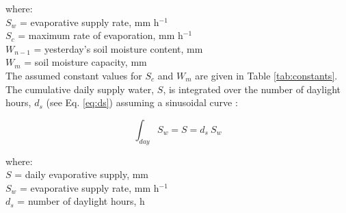 \noindent where: \\
\indent $S_w$ = evaporative supply rate, mm h$^{-1}$\\
\indent $S_c$ = maximum rate of evaporation, mm h$^{-1}$\\
\indent $W_{n-1}$ = yesterday's soil moisture content, mm\\
\indent $W_m$ = soil moisture capacity, mm\\

\noindent The assumed constant values for $S_c$ and $W_m$ are given in Table \ref{tab:constants}. 
The cumulative daily supply water, $S$, is integrated over the number of daylight hours, $d_s$ (see Eq. \ref{eq:ds}) assuming a sinusoidal curve \parencite[Eq. 18b]{federer82}:

\begin{equation}
\label{eq:sd}
    \int_{day} S_{w} = S = d_s\: S_w
\end{equation}

\noindent where: \\
\indent $S$ = daily evaporative supply, mm\\
\indent $S_{w}$ = evaporative supply rate, mm h$^{-1}$\\
\indent $d_s$ = number of daylight hours, h\\

